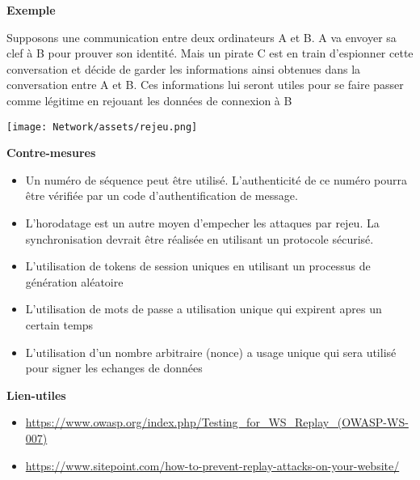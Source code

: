 \bigskip

\begin{flushleft}
\textbf{Exemple}
\end{flushleft}

\smallskip

\begin{flushleft}
Supposons une communication entre deux ordinateurs A et B. A va envoyer sa clef à B pour prouver son identité. Mais un pirate C est en train d'espionner cette conversation et décide de garder les informations ainsi obtenues dans la conversation entre A et B. Ces informations lui seront utiles pour se faire passer comme légitime en rejouant les données de connexion à B
\end{flushleft}

\smallskip

\begin{center}
\texttt{[image: Network/assets/rejeu.png]}
\end{center}

\bigskip


\begin{flushleft}
\textbf{Contre-mesures}
\end{flushleft}

\smallskip

\begin{itemize}
\item Un numéro de séquence peut être utilisé. L'authenticité de ce numéro pourra être vérifiée par un code d'authentification de message.
\item L'horodatage est un autre moyen d'empecher les attaques par rejeu. La synchronisation devrait être réalisée en utilisant un protocole sécurisé.
\item L'utilisation de tokens de session uniques en utilisant un processus de génération aléatoire
\item L'utilisation de mots de passe a utilisation unique qui expirent apres un certain temps
\item L'utilisation d'un nombre arbitraire (nonce) a usage unique qui sera utilisé pour signer les echanges de données
\end{itemize}

\bigskip

\begin{flushleft}
\textbf{Lien-utiles}
\end{flushleft}

\begin{itemize}
\item \url{https://www.owasp.org/index.php/Testing_for_WS_Replay_(OWASP-WS-007)}
\item \url{https://www.sitepoint.com/how-to-prevent-replay-attacks-on-your-website/}
\end{itemize}

\endinput
